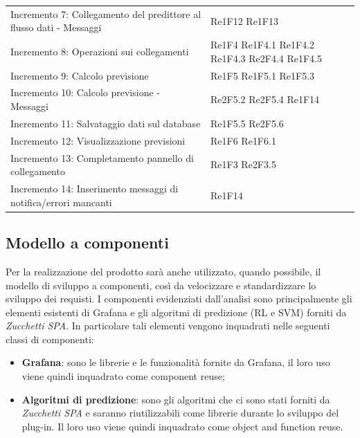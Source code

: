 \begin{longtable}{C{4cm} L{3cm}}
Incremento 7: Collegamento del predittore al flusso dati - Messaggi &  Re1F12 \newline Re1F13
\\
Incremento 8: Operazioni sui collegamenti & Re1F4 \newline Re1F4.1 \newline Re1F4.2 \newline Re1F4.3 \newline Re2F4.4 \newline Re1F4.5
\\
Incremento 9: \newline Calcolo previsione & Re1F5 \newline Re1F5.1 \newline Re1F5.3
\\
Incremento 10: Calcolo previsione - Messaggi & Re2F5.2 \newline Re2F5.4 \newline Re1F14
\\
Incremento 11: Salvataggio dati sul database & Re1F5.5 \newline  Re2F5.6
\\
Incremento 12: Visualizzazione previsioni & Re1F6 \newline Re1F6.1 \\
Incremento 13: Completamento pannello di collegamento & Re1F3 \newline Re2F3.5 \\
Incremento 14: Inserimento messaggi di notifica/errori mancanti & Re1F14\\ 
\end{longtable}
\pagebreak
\subsection{Modello a componenti}
Per la realizzazione del prodotto sarà anche utilizzato, quando possibile, il modello di sviluppo a componenti, così da velocizzare e standardizzare lo
sviluppo dei requisti. I componenti evidenziati dall’analisi sono principalmente
gli elementi esistenti di Grafana e gli algoritmi di predizione (RL e SVM) forniti
da \textit{Zucchetti SPA}. In particolare tali elementi vengono inquadrati nelle seguenti classi di componenti: \begin{itemize}
\item \textbf{Grafana}: sono le librerie e le funzionalità fornite da Grafana, il loro uso viene quindi inquadrato come component reuse;
\item \textbf{Algoritmi di predizione}: sono gli algoritmi che ci sono stati forniti da \textit{Zucchetti SPA} e saranno riutilizzabili come librerie durante lo sviluppo del plug-in. Il loro uso viene quindi inquadrato come object and
function reuse.
\end{itemize}
